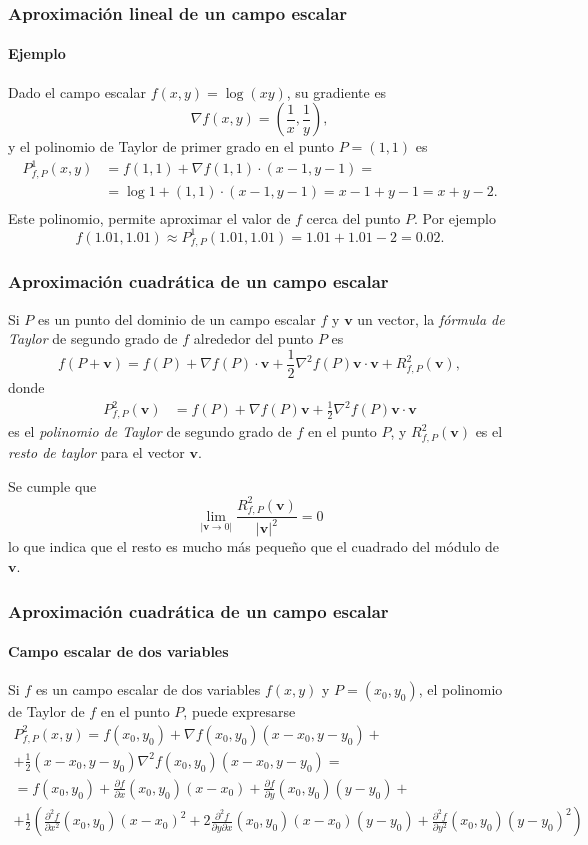 \begin{frame}
\frametitle{Aproximación lineal de un campo escalar}
\framesubtitle{Ejemplo}
Dado el campo escalar $f(x,y)=\log(xy)$, su gradiente es
\[
\nabla f(x,y) = \left(\frac{1}{x},\frac{1}{y}\right),
\]
y el polinomio de Taylor de primer grado en el punto $P=(1,1)$ es
\begin{align*}
P^1_{f,P}(x,y) &= f(1,1) +\nabla f(1,1)\cdot (x-1,y-1) = \\
&= \log 1+(1,1)\cdot(x-1,y-1) = x-1+y-1 = x+y-2.\\
\end{align*}
Este polinomio, permite aproximar el valor de $f$ cerca del punto $P$.
Por ejemplo
\[ 
f(1.01,1.01) \approx P^1_{f,P}(1.01,1.01) = 1.01+1.01-2 = 0.02.
\]
\end{frame}


\begin{frame}
\frametitle{Aproximación cuadrática de un campo escalar}
Si $P$ es un punto del dominio de un campo escalar $f$ y $\mathbf{v}$ un vector, la \emph{fórmula de Taylor} de segundo
grado de $f$ alrededor del punto $P$ es
\[
f(P+\mathbf{v}) = f(P) + \nabla f(P)\cdot \mathbf{v} + \frac{1}{2}\nabla^2f(P)\mathbf{v}\cdot\mathbf{v} + R^2_{f,P}(\mathbf{v}),
\]
donde 
\begin{align*}
P^2_{f,P}(\mathbf{v})&=f(P)+\nabla f(P)\mathbf{v}+\frac{1}{2}\nabla^2f(P)\mathbf{v}\cdot\mathbf{v}
\end{align*}
es el \emph{polinomio de Taylor} de segundo grado de $f$ en el punto $P$, y $R^2_{f,P}(\mathbf{v})$ es el \emph{resto de taylor} para el vector $\mathbf{v}$.

Se cumple que  
\[
\lim_{|\mathbf{v}\rightarrow 0|} \frac{R^2_{f,P}(\mathbf{v})}{|\mathbf{v}|^2} = 0
\]
lo que indica que el resto es mucho más pequeño que el cuadrado del módulo de $\mathbf{v}$.
\end{frame}


\begin{frame}
\frametitle{Aproximación cuadrática de un campo escalar}
\framesubtitle{Campo escalar de dos variables}
Si $f$ es un campo escalar de dos variables $f(x,y)$ y $P=(x_0,y_0)$, el polinomio de Taylor de $f$ en el punto $P$, puede expresarse
\begin{multline*}
P^2_{f,P}(x,y) = f(x_0,y_0)+\nabla f(x_0,y_0)(x-x_0,y-y_0) +\\
+\frac{1}{2}(x-x_0,y-y_0)\nabla^2f(x_0,y_0)(x-x_0,y-y_0)= \\
= f(x_0,y_0)+\frac{\partial f}{\partial x}(x_0,y_0)(x-x_0)+\frac{\partial f}{\partial y}(x_0,y_0)(y-y_0)+\\
+\frac{1}{2}\left(\frac{\partial^2 f}{\partial x^2}(x_0,y_0) (x-x_0)^2 + 2\frac{\partial^2 f}{\partial y\partial x}(x_0,y_0) (x-x_0)(y-y_0) + \frac{\partial^2 f}{\partial y^2}(x_0,y_0) (y-y_0)^2\right)
\end{multline*}
\end{frame}


